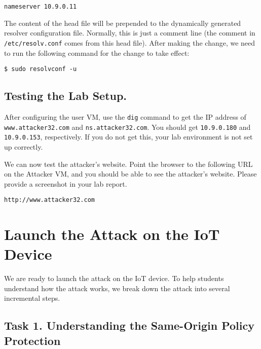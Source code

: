 \begin{lstlisting}
nameserver 10.9.0.11
\end{lstlisting}

The content of the head file will be prepended to the dynamically generated resolver
configuration file. Normally, this is just a comment line (the comment in
\texttt{/etc/resolv.conf} comes from this head file). After making the change,
we need to run the following command for the change to take effect: 

\begin{lstlisting}
$ sudo resolvconf -u
\end{lstlisting}




\subsection{Testing the Lab Setup.}

After configuring the user VM, use the \texttt{dig} command
to get the IP address of \texttt{www.attacker32.com}
and \texttt{ns.attacker32.com}. You should get 
\texttt{10.9.0.180} and \texttt{10.9.0.153}, respectively. 
If you do not get this, your lab environment is not 
set up correctly. 


We can now test the attacker's website. 
Point the browser to the following URL on the Attacker VM, and you should 
be able to see the attacker's website. 
Please provide a screenshot in your lab report. 

\begin{lstlisting}
http://www.attacker32.com
\end{lstlisting}




\section{Launch the Attack on the IoT Device}

We are ready to launch the attack on the IoT device. To help students 
understand how the attack works, we break down
the attack into several incremental steps. 


\subsection{Task 1. Understanding the Same-Origin Policy Protection}

